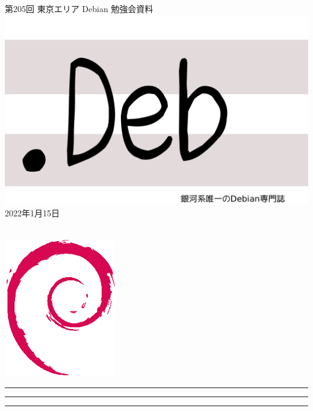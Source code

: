 \documentclass[mingoth,a4paper]{jsarticle}
\newcommand{\debmtgyear}{2022}
\newcommand{\debmtgmonth}{1}
\newcommand{\debmtgdate}{15}
\newcommand{\debmtgnumber}{205}
\begin{document}
\begin{titlepage}
\thispagestyle{empty}

\vspace*{-2cm}
第\debmtgnumber{}回 東京エリア Debian 勉強会資料\\
\hspace*{-2cm}
\includegraphics{image-assets/dotdeb.pdf}\\
\hfill{}\debmtgyear{}年\debmtgmonth{}月\debmtgdate{}日

\\

\vspace*{-2cm}
\hfill{}\includegraphics[height=6cm]{image-assets/openlogo-nd.eps}
\end{titlepage}

\newpage

\begin{minipage}[b]{0.2\hsize}
 \colorbox{titleback}{}
\end{minipage}
\begin{minipage}[b]{0.8\hsize}
\hrule
\vspace{2mm}
\hrule
\begin{multicols}{2}
\tableofcontents
\end{multicols}
\vspace{2mm}
\hrule
\end{minipage}
\end{document}
